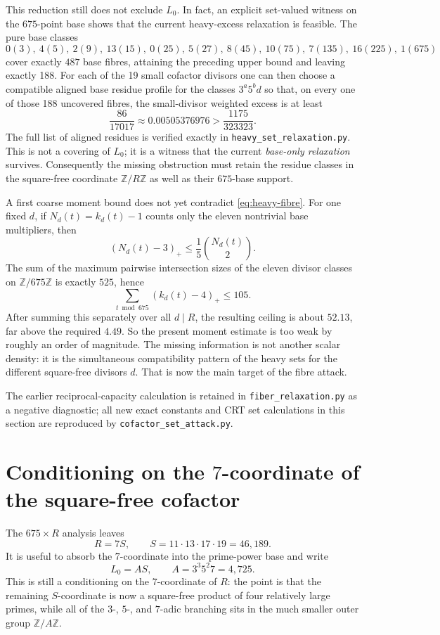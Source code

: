 \documentclass[11pt]{article}
\theoremstyle{definition}
\newcommand{\Z}{\mathbb Z}
\begin{document}
This reduction still does not exclude $L_0$.  In fact, an explicit set-valued witness on the
$675$-point base shows that the current heavy-excess relaxation is feasible.  The pure base
classes
\[
0(3),\ 4(5),\ 2(9),\ 13(15),\ 0(25),\ 5(27),\ 8(45),\ 10(75),\
7(135),\ 16(225),\ 1(675)
\]
cover exactly $487$ base fibres, attaining the preceding upper bound and leaving exactly 188.
For each of the 19 small cofactor divisors one can then choose a compatible aligned base residue
profile for the classes $3^a5^b d$ so that, on every one of those 188 uncovered fibres, the
small-divisor weighted excess is at least
\[
 \frac{86}{17017}\approx0.00505376976
 >\frac{1175}{323323}.
\]
The full list of aligned residues is verified exactly in
\texttt{heavy\_set\_relaxation.py}.  This is not a covering of $L_0$; it is a witness that the
current \emph{base-only relaxation} survives.  Consequently the missing obstruction must retain
the residue classes in the square-free coordinate $\Z/R\Z$ as well as their $675$-base support.

A first coarse moment bound does not yet contradict \eqref{eq:heavy-fibre}.  For one fixed
$d$, if $N_d(t)=k_d(t)-1$ counts only the eleven nontrivial base multipliers, then
\[
 (N_d(t)-3)_+\le \frac15\binom{N_d(t)}2.
\]
The sum of the maximum pairwise intersection sizes of the eleven divisor classes on
$\Z/675\Z$ is exactly $525$, hence
\[
 \sum_{t\bmod675}(k_d(t)-4)_+\le105.
\]
After summing this separately over all $d\mid R$, the resulting ceiling is about $52.13$, far
above the required $4.49$.  So the present moment estimate is too weak by roughly an order of
magnitude.  The missing information is not another scalar density: it is the simultaneous
compatibility pattern of the heavy sets for the different square-free divisors $d$.  That is now
the main target of the fibre attack.

The earlier reciprocal-capacity calculation is retained in \texttt{fiber\_relaxation.py} as a
negative diagnostic; all new exact constants and CRT set calculations in this section are
reproduced by \texttt{cofactor\_set\_attack.py}.


\section{Conditioning on the $7$-coordinate of the square-free cofactor}
\label{sec:seven-coordinate}

The $675\times R$ analysis leaves
\[
 R=7S,\qquad
 S=11\cdot13\cdot17\cdot19=46{,}189.
\]
It is useful to absorb the $7$-coordinate into the prime-power base and write
\[
 L_0=AS,
 \qquad
 A=3^3 5^2 7=4{,}725.
\]
This is still a conditioning on the $7$-coordinate of $R$: the point is that the remaining
$S$-coordinate is now a square-free product of four relatively large primes, while all of the
$3$-, $5$-, and $7$-adic branching sits in the much smaller outer group $\Z/A\Z$.
\end{document}
